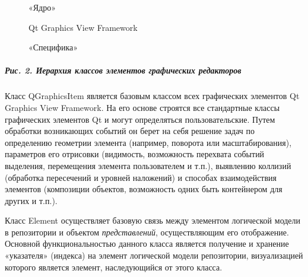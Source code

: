 \documentclass[a4paper]{article}
\begin{document}
\begin{figure}
\begin{center}
\begin{minipage}{2.849cm}
{
«Ядро»}
\end{minipage}
\end{center}
\end{figure}
\begin{figure}
\begin{center}
\begin{minipage}{6.024cm}
{
Qt Graphics View Framework}
\end{minipage}
\end{center}
\end{figure}
\begin{figure}
\begin{center}
\begin{minipage}{3.801cm}
{
«Специфика»}
\end{minipage}
\end{center}
\end{figure}
\subparagraph[Рис. 2. Иерархия классов элементов графических
редакторов]{Рис. 2. Иерархия классов элементов графических редакторов}

\bigskip

{
Класс \foreignlanguage{english}{QGraphicsItem} является базовым классом
всех графических элементов \foreignlanguage{english}{Qt}
\foreignlanguage{english}{Graphics} \foreignlanguage{english}{View}
\foreignlanguage{english}{Framework}. На его основе строятся все
стандартные классы графических элементов \foreignlanguage{english}{Qt}
и могут определяться пользовательские. Путем обработки возникающих
событий он берет на себя решение задач по определению геометрии
элемента (например, поворота или масштабирования), параметров его
отрисовки (видимость, возможность перехвата событий выделения,
перемещения элемента пользователем и т.п.), выявлению коллизий
(обработка пересечений и уровней наложений) и способах взаимодействия
элементов (композиции объектов, возможность одних быть контейнером для
других и т.п.).}

{
Класс \foreignlanguage{english}{Element} осуществляет базовую связь
между элементом логической модели в репозитории и объектом
\textit{представлений}, осуществляющим его отображение. Основной
функциональностью данного класса является получение и хранение
«указателя» (индекса) на элемент логической модели репозитории,
визуализацией которого является элемент, наследующийся от этого класса.
}
\end{document}
